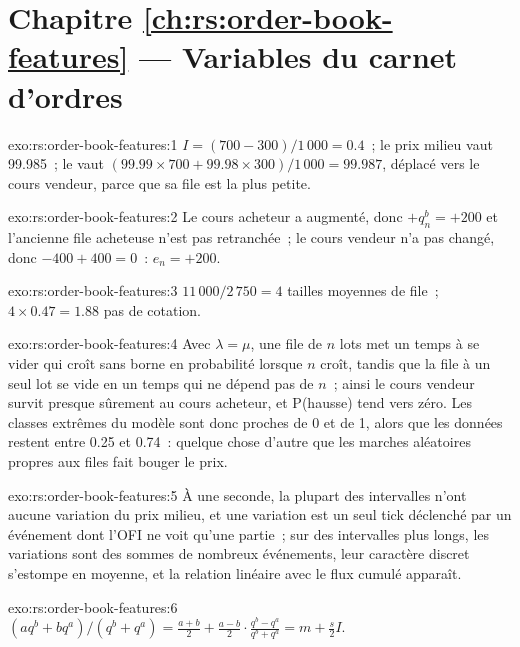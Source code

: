 \section*{Chapitre \ref{ch:rs:order-book-features} --- Variables du carnet d'ordres}

\begin{solution}{exo:rs:order-book-features:1}
$I = (700 - 300)/1\,000 = 0.4$~; le prix milieu vaut 99.985~; le  vaut $(99.99 \times 700 + 99.98 \times 300)/1\,000 = 99.987$, déplacé vers
le cours vendeur, parce que sa file est la plus petite.
\end{solution}

\begin{solution}{exo:rs:order-book-features:2}
Le cours acheteur a augmenté, donc $+q^b_n = +200$ et l'ancienne file acheteuse n'est pas retranchée~; le cours vendeur n'a pas changé, donc $-400 + 400 = 0$~: $e_n = +200$.
\end{solution}

\begin{solution}{exo:rs:order-book-features:3}
$11\,000/2\,750 = 4$ tailles moyennes de file~; $4 \times 0.47 = 1.88$ pas de cotation.
\end{solution}

\begin{solution}{exo:rs:order-book-features:4}
Avec $\lambda = \mu$, une file de $n$ lots met un temps à se vider qui croît sans borne en probabilité lorsque $n$ croît, tandis que la file à un seul lot
se vide en un temps qui ne dépend pas de $n$~; ainsi le cours vendeur survit presque sûrement au cours acheteur, et P(hausse) tend vers zéro. Les classes extrêmes du modèle
sont donc proches de 0 et de 1, alors que les données restent entre 0.25 et 0.74~: quelque chose d'autre que les marches aléatoires propres aux files fait
bouger le prix.
\end{solution}

\begin{solution}{exo:rs:order-book-features:5}
À une seconde, la plupart des intervalles n'ont aucune variation du prix milieu, et une variation est un seul tick déclenché par un événement dont l'OFI ne voit qu'une partie~; sur
des intervalles plus longs, les variations sont des sommes de nombreux événements, leur caractère discret s'estompe en moyenne, et la relation linéaire avec le flux cumulé apparaît.
\end{solution}

\begin{solution}{exo:rs:order-book-features:6}
$(a q^b + b q^a)/(q^b + q^a) = \frac{a + b}{2} + \frac{a - b}{2}\cdot\frac{q^b - q^a}{q^b + q^a} = m + \frac s2 I$.
\end{solution}

